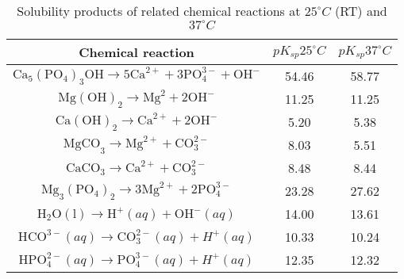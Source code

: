 \begin{table}[h]
\caption[Solubility products of related chemical reactions]{Solubility products of related chemical reactions at $25^{\circ}C$ (\gls{RT}) and $37^{\circ}C$ \cite{Wang2022}}
\medskip
\centering
\begin{tabular}{ccc}
\hline
Chemical reaction & $pK_{sp} 25^{\circ}C$ & $pK_{sp} 37^{\circ}C$ \\ \hline
$\mathrm{Ca}_{5}\left(\mathrm{PO}_{4}\right)_{3} \mathrm{OH}  \rightarrow 5 \mathrm{Ca}^{2+}+3 \mathrm{PO}_{4}^{3-}+\mathrm{OH}^{-}$ & 54.46 & 58.77 \\
$\mathrm{Mg}(\mathrm{OH})_{2}  \rightarrow \mathrm{Mg}^{2}+2 \mathrm{OH}^{-}$ & 11.25 & 11.25 \\
$\mathrm{Ca}(\mathrm{OH})_{2} \rightarrow \mathrm{Ca}^{2+}+2 \mathrm{OH}^{-}$ & 5.20 & 5.38 \\
$\mathrm{MgCO}_{3} \rightarrow \mathrm{Mg}^{2+}+\mathrm{CO}_{3}^{2-}$ & 8.03 & 5.51 \\
$\mathrm{CaCO}_{3}  \rightarrow \mathrm{Ca}^{2+}+\mathrm{CO}_{3}^{2-}$ & 8.48 & 8.44 \\
$\mathrm{Mg}_{3}\left(\mathrm{PO}_{4}\right)_{2}  \rightarrow 3 \mathrm{Mg}^{2+}+2 \mathrm{PO}_{4}^{3-}$ & 23.28 & 27.62 \\
$\mathrm{H}_{2} \mathrm{O}(\mathrm{l})  \rightarrow \mathrm{H}^{+}(aq)+\mathrm{OH}^{-}(a q)$ & 14.00 & 13.61 \\
$\mathrm{HCO}^{3-}(aq) \rightarrow \mathrm{CO}_{3}^{2-}(aq)+H^{+}(aq)$ & 10.33 & 10.24 \\
$\mathrm{HPO}_{4}^{2-}(aq) \rightarrow \mathrm{PO}_{4}^{3-}(a q)+H^{+}(aq)$ & 12.35 & 12.32 \\
\hline
\end{tabular}
\label{tab:kinetics_reactions}
\end{table}

